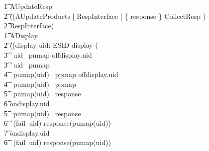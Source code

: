 \begin{circus}
        \t1 AUpdateResp \circdef \\
        \t2 ((AUpdateProducts \lpar \emptyset | RespInterface | \{ response \} \rpar CollectResp ) \\
        \t2 \circhide RespInterface) \\
%
%
        \t1 ADisplay \circdef \\
        \t2 ((\lpar \lchanset display \rchanset \rpar uid: ESID \circspot \lpar \emptyset \rpar display \then ( \\
        \t3 \circif\ uid \notin \dom~pumap \circthen offdisplay.uid \then \Skip\\
        \t3 \circelse\ uid \in \dom~pumap \circthen \\
            \t4 \circif\ pumap(uid) \notin \dom~ppmap \circthen offdisplay.uid \then \Skip\\
            \t4 \circelse\ pumap(uid) \in \dom~ppmap \circthen \\
                \t5 \circif\ pumap(uid) \notin \dom~response \circthen \\
                    \t6 ondisplay.uid \then \Skip\\
                \t5 \circelse\ pumap(uid) \in \dom~response \circthen \\
                    \t6 \circif\ (fail~uid) \notin response(pumap(uid)) \circthen \\
                    \t7 ondisplay.uid \then \Skip\\
                    \t6 \circelse\ (fail~uid) \in response(pumap(uid)) \circthen \\

\end{circus}
